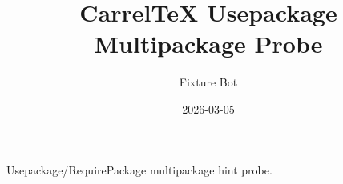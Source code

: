 \documentclass{article}
\title{CarrelTeX Usepackage Multipackage Probe}
\author{Fixture Bot}
\date{2026-03-05}
\begin{document}
\maketitle

Usepackage/RequirePackage multipackage hint probe.
\end{document}
